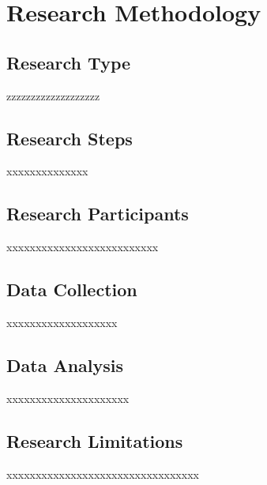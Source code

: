 \chapter{Research Methodology}

\section{Research Type}
zzzzzzzzzzzzzzzzzzz

\section{Research Steps}
xxxxxxxxxxxxxx


\section{Research Participants}
xxxxxxxxxxxxxxxxxxxxxxxxxx

\section{Data Collection}
xxxxxxxxxxxxxxxxxxx

\section{Data Analysis}
xxxxxxxxxxxxxxxxxxxxx

\section{Research Limitations}
xxxxxxxxxxxxxxxxxxxxxxxxxxxxxxxxx
